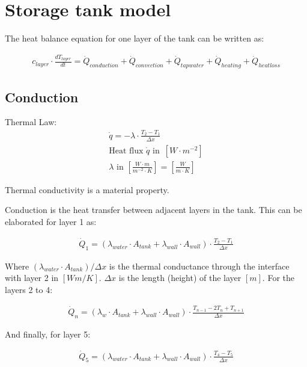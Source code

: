 \section{Storage tank model}

The heat balance equation for one layer of the tank can be written as:

\begin{eqnarray}
	c_{layer} \cdot \frac{dT_{layer}}{dt} = \dot{Q}_{conduction} + \dot{Q}_{convection} + \dot{Q}_{tapwater} + \dot{Q}_{heating} + \dot{Q}_{heatloss}
\end{eqnarray}

\subsection{Conduction}

Thermal Law: 
\begin{eqnarray}
	\dot{q} = - \lambda \cdot \frac{T_2 - T_1}{\Delta x} \\
    \text{Heat flux } \dot q  \text{ in } \, [W \cdot m^{-2}] \\
    \lambda \text{ in } [\frac{ W \cdot m}{m^{-2}\cdot K}] 
    = [\frac{W}{m \cdot K}]
\end{eqnarray}	

Thermal conductivity is a material property.


Conduction is the heat transfer between adjacent layers in the tank. This can be elaborated for layer 1 as:

\begin{eqnarray}
	\dot{Q}_1 = (\lambda_{water}\cdot A_{tank} + \lambda_{wall} \cdot A_{wall} )\cdot \frac{T_2 - T_1}{\Delta x}
\end{eqnarray}

Where $(\lambda_{water} \cdot A_{tank} ) / \Delta x$ is the thermal conductance through the interface with layer 2 in $[Wm/K]$. $\Delta x$ is the length (height) of the layer $[m]$.  For the layers 2 to 4: 

\begin{eqnarray}
	\dot{Q}_n = (\lambda_{w}\cdot A_{tank} + \lambda_{wall} \cdot A_{wall}) \cdot \frac{T_{n-1} - 2T_n + T_{n+1}}{\Delta x}
\end{eqnarray}

And finally, for layer 5:

\begin{eqnarray}
	\dot{Q}_5 = (\lambda_{water}\cdot A_{tank} + \lambda_{wall} \cdot A_{wall}) \cdot \frac{T_4 - T_5}{\Delta x}
\end{eqnarray} 

\newpage